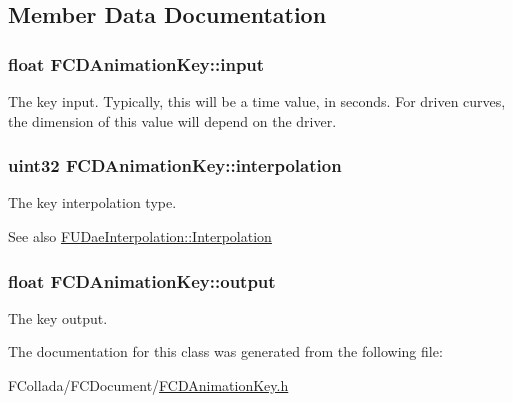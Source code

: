 \subsection{Member Data Documentation}
\hypertarget{classFCDAnimationKey_a1591f4d28aac7dff40d92b0308809a7f}{
\subsubsection[{input}]{\setlength{\rightskip}{0pt plus 5cm}float {\bf FCDAnimationKey::input}}}
\label{classFCDAnimationKey_a1591f4d28aac7dff40d92b0308809a7f}
The key input. Typically, this will be a time value, in seconds. For driven curves, the dimension of this value will depend on the driver. \hypertarget{classFCDAnimationKey_a09ea6034885bc7a3c8af91afa68a52ed}{
\subsubsection[{interpolation}]{\setlength{\rightskip}{0pt plus 5cm}uint32 {\bf FCDAnimationKey::interpolation}}}
\label{classFCDAnimationKey_a09ea6034885bc7a3c8af91afa68a52ed}
The key interpolation type. \begin{DoxySeeAlso}{See also}
\hyperlink{namespaceFUDaeInterpolation_a209a941c2fb6ece1325352968aa0374f}{FUDaeInterpolation::Interpolation} 
\end{DoxySeeAlso}
\hypertarget{classFCDAnimationKey_aa779e0e946f47dbc9a2d6b9eeb58d6c2}{
\subsubsection[{output}]{\setlength{\rightskip}{0pt plus 5cm}float {\bf FCDAnimationKey::output}}}
\label{classFCDAnimationKey_aa779e0e946f47dbc9a2d6b9eeb58d6c2}
The key output. 

The documentation for this class was generated from the following file:\begin{DoxyCompactItemize}
\item 
FCollada/FCDocument/\hyperlink{FCDAnimationKey_8h}{FCDAnimationKey.h}\end{DoxyCompactItemize}

